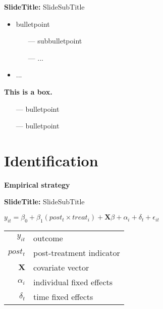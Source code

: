 \documentclass{beamer} %
\begin{document}
\begin{frame}{\textbf{SlideTitle:} SlideSubTitle}
	\begin{itemize}
	    \item bulletpoint
    	\begin{itemize}
    	    \item[---] subbulletpoint
    	    \item[---] ...
    	\end{itemize}
    	\item ...
	\end{itemize}
	\vspace{.4cm}
	\begin{finding*}
	{\hspace{-.4cm}\textcolor{ifo-blue}{\textbf{This is a box.}}}{
	    \begin{itemize}
	        \item[---] bulletpoint
	        \item[---] bulletpoint
	    \end{itemize}
	}
	\end{finding*}
\end{frame}

\section{Identification}
{
	\begin{frame}[plain]		
		\vspace{1cm}
		{\color{white}\LARGE \textbf{Empirical strategy}}
	\end{frame}
	\addtocounter{framenumber}{-1}
}

\begin{frame}{\textbf{SlideTitle:} SlideSubTitle}
    \begin{centering}
        {$y_{it} = \beta_{0} + \beta_{1} (post_{t}\times treat_{i}) + \pmb{X}\beta+ \alpha_{i} + \delta_{t} + \epsilon_{it}$}\\
    \end{centering}
    \vspace{.5cm}
    \begin{footnotesize}
        \hspace{2cm}\begin{tabular}{ r l }
            $y_{it}$ & outcome \\ 
            $post_{t}$ & post-treatment indicator\\
            $\pmb{X}$ & covariate vector\\
            $\alpha_{i}$ & individual fixed effects\\
            $\delta_{t}$ & time fixed effects
        \end{tabular}
    \end{footnotesize}
\end{frame}
\end{document}
